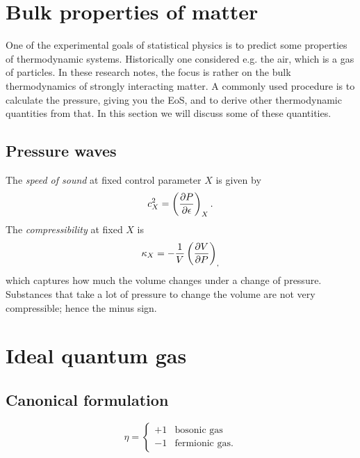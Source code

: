 
\section{Bulk properties of matter}

One of the experimental goals of statistical physics is to predict some
properties of thermodynamic systems. Historically one considered e.g.
the air, which is a gas of particles. In these research notes, the focus
is rather on the bulk thermodynamics of strongly interacting matter.
A commonly used procedure is to calculate the pressure, giving
you the EoS, and to derive other thermodynamic quantities from that.
In this section we will discuss some of these quantities.

\subsection{Pressure waves}
The {\it speed of sound} at fixed control parameter $X$
is given by
\begin{equation}
  c_X^2=\left(\pdv{P}{\epsilon}\right)_{X}.
\end{equation}
The {\it compressibility} at fixed $X$ is
\begin{equation}
  \kappa_X=-\frac{1}{V}\left(\pdv{V}{P}\right)_{,}
\end{equation}
which captures how much the volume changes under a change of pressure.
Substances that take a lot of pressure to change the volume are not
very compressible; hence the minus sign.

\section{Ideal quantum gas}

\subsection{Canonical formulation}

\begin{equation}
\eta=
  \begin{cases}
     +1 & \text{bosonic gas} \\
     -1 & \text{fermionic gas}.
  \end{cases}
\end{equation}

